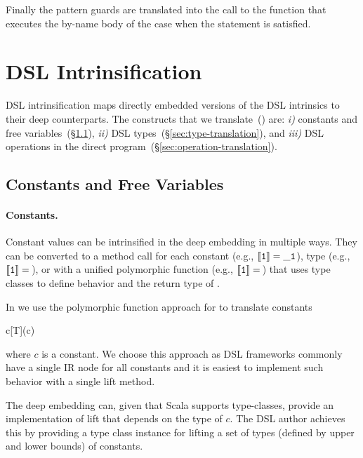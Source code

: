 Finally the pattern guards are translated into the call to the  function that executes the
by-name body of the case when the  statement is satisfied.


\section{DSL Intrinsification}
\label{sec:dsl-intrinsification}

DSL intrinsification maps directly embedded versions
 of the DSL intrinsics to their deep counterparts. The constructs that
 we translate~() are: \emph{i)} constants and
 free variables~(\S \ref{sec:constants-and-free-variables}), \emph{ii)} DSL types~(\S \ref{sec:type-translation}), and \emph{iii)} DSL operations in the direct program~(\S \ref{sec:operation-translation}).

\subsection{Constants and Free Variables}
\label{sec:constants-and-free-variables}

 \paragraph{Constants.} Constant values can be intrinsified in the deep embedding in multiple ways.
 They can be converted to a method call for each constant (e.g., $\left\llbracket \mathtt{1} \right\rrbracket = \mathtt{\_1}$),
  type (e.g., $\left\llbracket \mathtt{1} \right\rrbracket = \,$), or with a unified polymorphic function (e.g., $\left\llbracket \mathtt{1} \right\rrbracket = \,$) that uses type classes to define behavior and the return type of .

  In \yy we use the polymorphic function approach for to translate constants

      \infyy{}
          {}
          {c}{[T](c)}

  where $c$ is a constant. We choose this approach as DSL frameworks
  commonly have a single IR node for all constants and it is easiest to implement
  such behavior with a single lift method.

  The deep embedding can, given that Scala supports type-classes, provide an implementation
  of lift that depends on the type of $c$. The DSL author achieves this
  by providing a type class instance for lifting a set of types (defined by upper and lower bounds)
  of constants.

